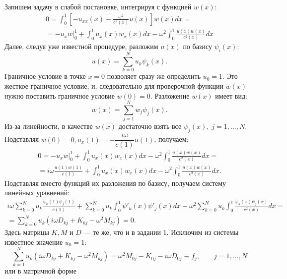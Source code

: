 \documentclass[12pt]{article}
\begin{document}
Запишем задачу в слабой постановке, интегрируя с функцией $w(x)$:
\begin{multline}
0 = \int_0^1 \left[-u_{xx}(x) - \frac{\omega^2}{c^2(x)} u(x)\right] w(x) dx = \\
=-u_x w\Big|_0^1 + \int_0^1 u_x(x) w_x(x) dx - \omega^2 \int_0^1 \frac{u(x)
w(x)}{c^2(x)} dx
\end{multline}
Далее, следуя уже известной процедуре, разложим $u(x)$ по базису $\psi_i(x)$:
\[
u(x) = \sum_{k=0}^N u_k \psi_k(x).
\]
Граничное условие в точке $x = 0$ позволяет сразу же определить $u_0 = 1$.
Это жесткое граничное условие, и, следовательно для проверочной функции $w(x)$ нужно
поставить граничное условие $w(0) = 0$. Разложение $w(x)$ имеет вид:
\[
w(x) = \sum_{j=1}^N w_j \psi_j(x).
\]
Из-за линейности, в качестве $w(x)$ достаточно взять все $\psi_j(x),\; j = 1,
\dots, N$. Подставляя $w(0) = 0, u_x(1) = -\dfrac{i\omega}{c(1)} u(1)$, получаем:
\begin{multline}
0 = -u_x w\Big|_0^1 + \int_0^1 u_x(x) w_x(x) dx - \omega^2 \int_0^1
\frac{u(x)w(x)}{c^2(x)}dx = \\ 
=
i\omega \frac{u(1) w(1)}{c(1)}
+ \int_0^1 u_x(x) w_x(x) dx 
- \omega^2 \int_0^1 \frac{u(x)w(x)}{c^2(x)} dx.
\end{multline}
Подставляя вместо функций их разложения по базису, получаем систему линейных
уравнений:
\begin{multline}
i\omega \sum_{k=0}^N u_k \frac{\psi_k(1)\psi_j(1)}{c(1)}
+\sum_{k=0}^N u_k \int_0^1 \psi'_k(x) \psi'_j(x) dx
-\omega^2 \sum_{k=0}^N u_k \int_0^1 \frac{\psi_k(x) \psi_j(x)}{c^2(x)} dx = \\
= \sum_{k=0}^N u_k \left(i\omega D_{kj} + K_{kj} -\omega^2 M_{kj}\right) = 0.
\end{multline}
Здесь матрицы $K, M$ и $D$ --- те же, что и в задании 1. Исключим из системы
известное значение $u_0 = 1$:
\[
\sum_{k=1}^N u_k \left(i\omega D_{kj} + K_{kj} -\omega^2 M_{kj}\right) =
\omega^2 M_{0j} - K_{0j} -i\omega D_{0j} \equiv f_j, \qquad j = 1, \dots, N
\]
или в матричной форме
\end{document}
